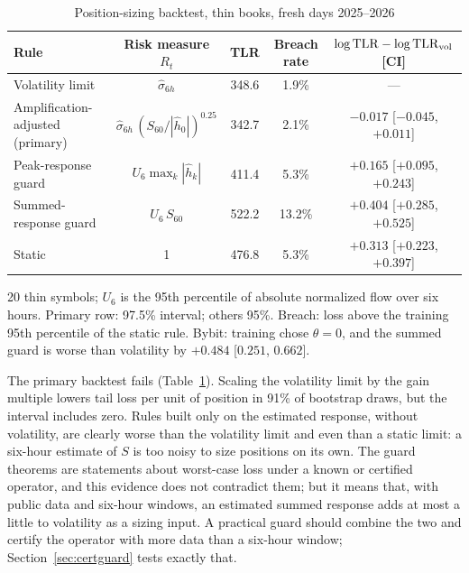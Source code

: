 \begin{table}[t]\centering\small
\begin{threeparttable}
\caption{Position-sizing backtest, thin books, fresh days 2025--2026}\label{tab:backtest}
\begin{tabular}{lcccc}
\toprule
Rule & Risk measure $R_t$ & TLR & Breach rate & $\log{\rm TLR}-\log{\rm TLR}_{\rm vol}$ [CI]\\
\midrule
Volatility limit & $\hat\sigma_{6h}$ & 348.6 & 1.9\% & ---\\
Amplification-adjusted (primary) & $\hat\sigma_{6h}\,(S_{60}/|\hat h_0|)^{0.25}$ & 342.7 & 2.1\% & $-0.017$ [$-0.045$, $+0.011$]\\
Peak-response guard & $U_6\max_k|\hat h_k|$ & 411.4 & 5.3\% & $+0.165$ [$+0.095$, $+0.243$]\\
Summed-response guard & $U_6\,S_{60}$ & 522.2 & 13.2\% & $+0.404$ [$+0.285$, $+0.525$]\\
Static & 1 & 476.8 & 5.3\% & $+0.313$ [$+0.223$, $+0.397$]\\
\bottomrule
\end{tabular}
\begin{tablenotes}\footnotesize\item 20 thin symbols; $U_6$ is the 95th percentile of absolute normalized flow over six hours. Primary row: 97.5\% interval; others 95\%. Breach: loss above the training 95th percentile of the static rule. Bybit: training chose $\theta=0$, and the summed guard is worse than volatility by $+0.484$ [$0.251$, $0.662$]. \end{tablenotes}
\end{threeparttable}
\end{table}

The primary backtest fails (Table~\ref{tab:backtest}). Scaling the volatility limit by the gain multiple lowers tail loss per unit of position in 91\% of bootstrap draws, but the interval includes zero. Rules built only on the estimated response, without volatility, are clearly worse than the volatility limit and even than a static limit: a six-hour estimate of $S$ is too noisy to size positions on its own. The guard theorems are statements about worst-case loss under a known or certified operator, and this evidence does not contradict them; but it means that, with public data and six-hour windows, an estimated summed response adds at most a little to volatility as a sizing input. A practical guard should combine the two and certify the operator with more data than a six-hour window; Section~\ref{sec:certguard} tests exactly that.

